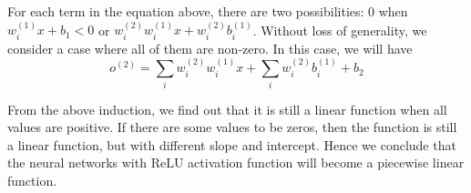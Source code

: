 \begin{itemize}
For each term in the equation above, there are two possibilities: $0$ when $w_i^{(1)}x+b_1<0$ or $w_i^{(2)}w_i^{(1)}x+w_i^{(2)}b_i^{(1)}$. Without loss of generality, we consider a case where all of them are non-zero. In this case, we will have $$o^{(2)}=\sum_{i}w_i^{(2)}w_i^{(1)}x+\sum_i w_i^{(2)}b_i^{(1)}+b_2$$ 

From the above induction, we find out that it is still a linear function when all values are positive. If there are some values to be zeros, then the function is still a linear function, but with different slope and intercept. Hence we conclude that the neural networks with ReLU activation function will become a piecewise linear function.

\end{itemize}